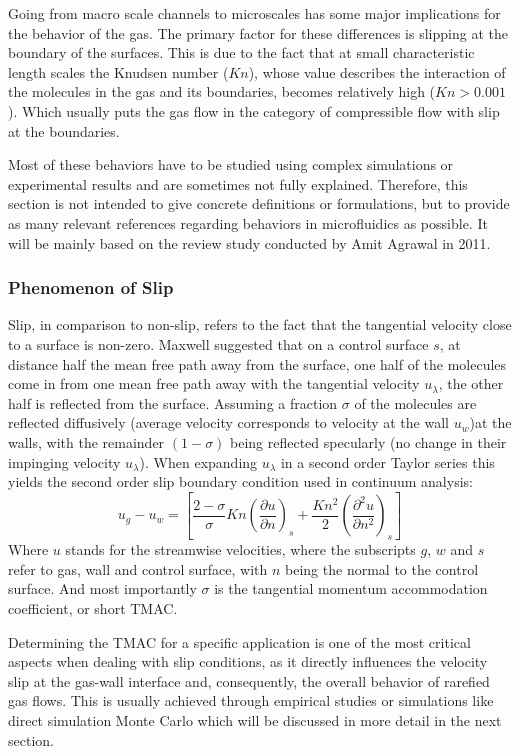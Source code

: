 	Going from macro scale channels to microscales has some major implications for the behavior of the gas.
	The primary factor for these differences is slipping at the boundary of the surfaces.
	This is due to the fact that at small characteristic length scales the Knudsen number ($Kn$), whose value describes the interaction of the molecules in the gas and its boundaries, becomes relatively high ($Kn > 0.001$).
	Which usually puts the gas flow in the category of compressible flow with slip at the boundaries.

	Most of these behaviors have to be studied using complex simulations or experimental results and are sometimes not fully explained.
	Therefore, this section is not intended to give concrete definitions or formulations, but to provide as many relevant references regarding behaviors in microfluidics as possible.
	It will be mainly based on the review study conducted by Amit Agrawal in 2011.

\subsubsection*{Phenomenon of Slip}
	Slip, in comparison to non-slip, refers to the fact that the tangential velocity close to a surface is non-zero.
	Maxwell suggested that on a control surface $s$, at distance half the mean free path away from the surface, one half of the molecules come in from one mean free path away with the tangential velocity $u_\lambda$, the other half is reflected from the surface.
	Assuming a fraction $\sigma$ of the molecules are reflected diffusively (average velocity corresponds to velocity at the wall $u_w$)at the walls, with the remainder $(1-\sigma)$ being reflected specularly (no change in their impinging velocity $u_\lambda$).
	When expanding $u_\lambda$ in a second order Taylor series this yields the second order slip boundary condition used in continuum analysis:
	\begin{equation}
		u_g - u_w =
		\left[
			\frac{2-\sigma}{\sigma}Kn\left(\frac{\partial u}{\partial n}\right)_s
			+ \frac{Kn^2}{2} \left(\frac{\partial^2 u}{\partial n^2}\right)_s
		\right]
	\end{equation}
	Where $u$ stands for the streamwise velocities, where the subscripts $g$, $w$ and $s$ refer to gas, wall and control surface, with $n$ being the normal to the control surface.
	And most importantly $\sigma$ is the tangential momentum accommodation coefficient, or short TMAC.

	Determining the TMAC for a specific application is one of the most critical aspects when dealing with slip conditions, as it directly influences the velocity slip at the gas-wall interface and, consequently, the overall behavior of rarefied gas flows.
	This is usually achieved through empirical studies or simulations like direct simulation Monte Carlo which will be discussed in more detail in the next section.

